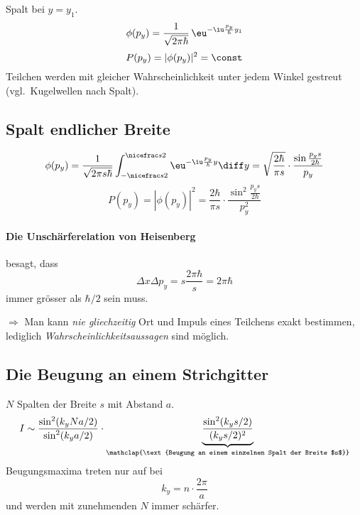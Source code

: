				Spalt bei $y=y_1$.
				\[
					\phi(p_y) = \frac{1}{\sqrt{2\pi\hbar}} \,\eu^{- \iu \frac{p_y}{\hbar} y_1}
				\]
				\[
					P(p_y) = |\phi(p_y)|^2 = \const
				\]
				Teilchen werden mit gleicher Wahrscheinlichkeit unter jedem Winkel gestreut (vgl.~Kugelwellen nach Spalt).
			\subsection{Spalt endlicher Breite} %
				\[
					\phi(p_y) = \frac{1}{\sqrt{2\pi s \hbar}} \int_{-\nicefrac s 2}^{\nicefrac s 2} \eu^{-\iu \frac{p_y}{\hbar}y} \diff y = \sqrt{\frac{2\hbar}{\pi s}} \cdot \frac{\sin\frac{p_y s}{2\hbar}}{p_y}
				\]
				\[
					P(p_y) = |\phi(p_y)|^2 = \frac{2\hbar}{\pi s} \cdot \frac{\sin^2\frac{p_y s}{2\hbar}}{p_y^2}
				\]
		\paragraph{Die Unschärferelation von Heisenberg} %
			besagt, dass
			\[
				\Delta x \Delta p_y = s \frac{2 \pi \hbar}{s} = 2\pi\hbar
			\]
			immer grösser als $\hbar/2$ sein muss.
			
			$\Rightarrow$ Man kann \emph{nie gliechzeitig} Ort und Impuls eines Teilchens exakt bestimmen, lediglich \emph{Wahrscheinlichkeitsaussagen} sind möglich.
	\subsection{Die Beugung an einem Strichgitter} %
		$N$ Spalten der Breite $s$ mit Abstand $a$.
		\[
			I \sim \frac{\sin^2(k_y N a/2)}{\sin^2(k_y a / 2)} \cdot \underbrace{\frac{\sin^2(k_y s /2)}{(k_y s / 2)^2}}_{\mathclap{\text{Beugung an einem einzelnen Spalt der Breite $s$}}}
		\]
		Beugungsmaxima treten nur auf bei
		\[
			k_y = n \cdot \frac{2\pi}{a}
		\]
		und werden mit zunehmenden $N$ immer schärfer.
